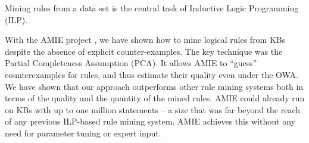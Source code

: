 Mining rules from a data set is the central task of Inductive Logic Programming (ILP).


With the AMIE project \cite{amie}, we have shown how to mine logical rules from KBs despite the absence of explicit counter-examples.
The key technique was the Partial Completeness Assumption (PCA). It 
allows AMIE to ``guess'' counterexamples for rules, and thus estimate their quality even under the OWA.
We have shown that our approach outperforms other rule mining systems %
both in terms of the quality and the quantity of the mined rules.
AMIE could already run on KBs with up to one million statements -- a size that was far beyond the reach of any previous ILP-based rule mining system.
AMIE achieves this without any need for parameter tuning or expert input.

